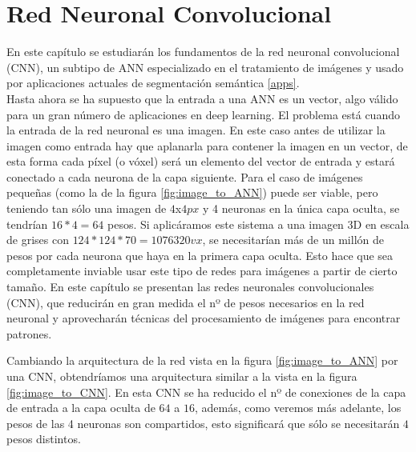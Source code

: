 \chapter{Red Neuronal Convolucional}\label{cnn}

En este capítulo se estudiarán los fundamentos de la red neuronal convolucional (CNN), un subtipo de ANN especializado en el tratamiento de imágenes y usado por aplicaciones actuales de segmentación semántica \ref{apps}.\\

Hasta ahora se ha supuesto que la entrada a una ANN es un vector, algo válido para un gran número de aplicaciones en deep learning. El problema está cuando la entrada de la red neuronal es una imagen. En este caso antes de utilizar la imagen como entrada hay que aplanarla para contener la imagen en un vector, de esta forma cada píxel (o vóxel) será un elemento del vector de entrada y estará conectado a cada neurona de la capa siguiente. Para el caso de imágenes pequeñas (como la de la figura \ref{fig:image_to_ANN}) puede ser viable, pero teniendo tan sólo una imagen de $4$x$4px$ y 4 neuronas en la única capa oculta, se tendrían $16*4=64$ pesos. Si aplicáramos este sistema a una imagen 3D en escala de grises con $124*124*70=1076320vx$, se necesitarían más de un millón de pesos por cada neurona que haya en la primera capa oculta. Esto hace que sea completamente inviable usar este tipo de redes para imágenes a partir de cierto tamaño. En este capítulo se presentan las redes neuronales convolucionales (CNN), que reducirán en gran medida el nº de pesos necesarios en la red neuronal y aprovecharán técnicas del procesamiento de imágenes para encontrar patrones.


Cambiando la arquitectura de la red vista en la figura \ref{fig:image_to_ANN} por una CNN, obtendríamos una arquitectura similar a la vista en la figura \ref{fig:image_to_CNN}. En esta CNN se ha reducido el nº de conexiones de la capa de entrada a la capa oculta de $64$ a $16$, además, como veremos más adelante, los pesos de las 4 neuronas son compartidos, esto significará que sólo se necesitarán $4$ pesos distintos.


